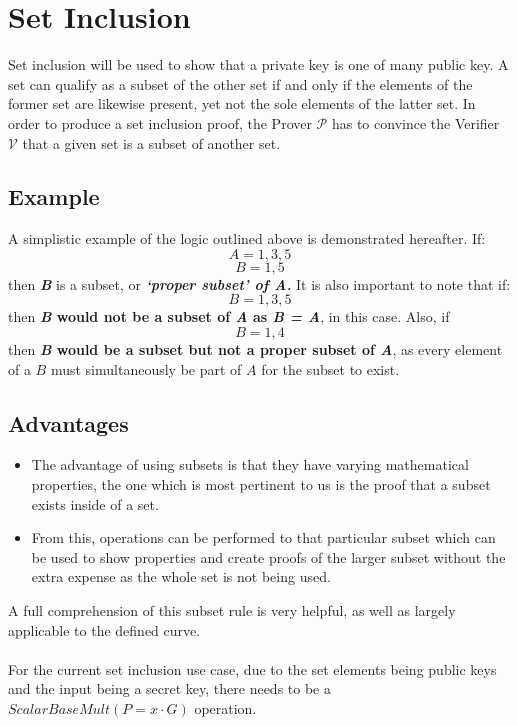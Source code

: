\documentclass{article}
\begin{document}
\section{Set Inclusion}
Set inclusion will be used to show that a private key is one of many public key. A set can qualify as a subset of the other set if and only if the elements of the former set are likewise present, yet not the sole elements of the latter set. In order to produce a set inclusion proof, the Prover $\mathcal{P}$ has to convince the Verifier $\mathcal{V}$ that a given set is a subset of another set.
\subsection{Example}
A simplistic example of the logic outlined above is demonstrated hereafter. If:  $$ A={1,3,5} $$
$$ B={1,5} $$ then \textbf{\textit{B}} is a subset, or \textbf{\textit{‘proper subset’ of A.}} 
It is also important to note that if: $$ B={1,3,5} $$ then \textbf{\textit{B} would not be a subset of \textit{A} as \textit{B = A}}, in this case. Also, if $$ B={1,4} $$ then \textbf{\textit{B} would be a subset but not a proper subset of \textit{A}}, as every element of a $B$ must simultaneously be part of $A$ for the subset to exist.
\subsection{Advantages}
\begin{itemize}
    \item The advantage of using subsets is that they have varying mathematical properties, the one which is most pertinent to us is the proof that a subset exists inside of a set.
    \item From this, operations can be performed to that particular subset which can be used to show properties and create proofs of the larger subset without the extra expense as the whole set is not being used.
\end{itemize}
A full comprehension of this subset rule is very helpful, as well as largely applicable to the defined curve. \\\\
For the current set inclusion use case, due to the set elements being public keys and the input being a secret key, there needs to be a $ScalarBaseMult (P=x\cdot G)$ operation.
\end{document}
